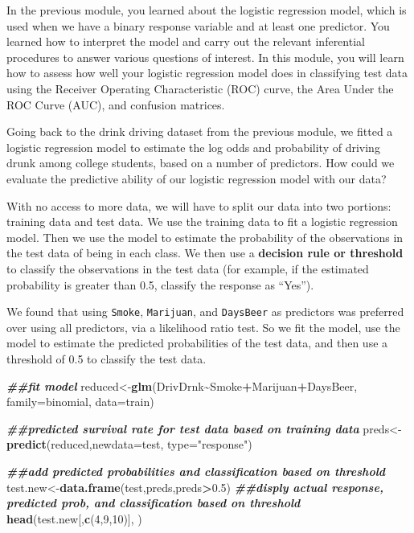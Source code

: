 \documentclass[
]{book}
\newenvironment{Shaded}{\begin{snugshade}}{\end{snugshade}}
\newcommand{\AttributeTok}[1]{\textcolor[rgb]{0.13,0.29,0.53}{#1}}
\newcommand{\DecValTok}[1]{\textcolor[rgb]{0.00,0.00,0.81}{#1}}
\newcommand{\DocumentationTok}[1]{\textcolor[rgb]{0.56,0.35,0.01}{\textbf{\textit{#1}}}}
\newcommand{\FloatTok}[1]{\textcolor[rgb]{0.00,0.00,0.81}{#1}}
\newcommand{\FunctionTok}[1]{\textcolor[rgb]{0.13,0.29,0.53}{\textbf{#1}}}
\newcommand{\NormalTok}[1]{#1}
\newcommand{\OtherTok}[1]{\textcolor[rgb]{0.56,0.35,0.01}{#1}}
\newcommand{\SpecialCharTok}[1]{\textcolor[rgb]{0.81,0.36,0.00}{\textbf{#1}}}
\newcommand{\StringTok}[1]{\textcolor[rgb]{0.31,0.60,0.02}{#1}}
\begin{document}
In the previous module, you learned about the logistic regression model, which is used when we have a binary response variable and at least one predictor. You learned how to interpret the model and carry out the relevant inferential procedures to answer various questions of interest. In this module, you will learn how to assess how well your logistic regression model does in classifying test data using the Receiver Operating Characteristic (ROC) curve, the Area Under the ROC Curve (AUC), and confusion matrices.

Going back to the drink driving dataset from the previous module, we fitted a logistic regression model to estimate the log odds and probability of driving drunk among college students, based on a number of predictors. How could we evaluate the predictive ability of our logistic regression model with our data?

With no access to more data, we will have to split our data into two portions: training data and test data. We use the training data to fit a logistic regression model. Then we use the model to estimate the probability of the observations in the test data of being in each class. We then use a \textbf{decision rule or threshold} to classify the observations in the test data (for example, if the estimated probability is greater than 0.5, classify the response as ``Yes'').

We found that using \texttt{Smoke}, \texttt{Marijuan}, and \texttt{DaysBeer} as predictors was preferred over using all predictors, via a likelihood ratio test. So we fit the model, use the model to estimate the predicted probabilities of the test data, and then use a threshold of 0.5 to classify the test data.

\begin{Shaded}
\begin{Highlighting}[]
\DocumentationTok{\#\#fit model}
\NormalTok{reduced}\OtherTok{\textless{}{-}}\FunctionTok{glm}\NormalTok{(DrivDrnk}\SpecialCharTok{\textasciitilde{}}\NormalTok{Smoke}\SpecialCharTok{+}\NormalTok{Marijuan}\SpecialCharTok{+}\NormalTok{DaysBeer, }\AttributeTok{family=}\NormalTok{binomial, }\AttributeTok{data=}\NormalTok{train)}

\DocumentationTok{\#\#predicted survival rate for test data based on training data}
\NormalTok{preds}\OtherTok{\textless{}{-}}\FunctionTok{predict}\NormalTok{(reduced,}\AttributeTok{newdata=}\NormalTok{test, }\AttributeTok{type=}\StringTok{"response"}\NormalTok{)}

\DocumentationTok{\#\#add predicted probabilities and classification based on threshold}
\NormalTok{test.new}\OtherTok{\textless{}{-}}\FunctionTok{data.frame}\NormalTok{(test,preds,preds}\SpecialCharTok{\textgreater{}}\FloatTok{0.5}\NormalTok{)}
\DocumentationTok{\#\#disply actual response, predicted prob, and classification based on threshold}
\FunctionTok{head}\NormalTok{(test.new[,}\FunctionTok{c}\NormalTok{(}\DecValTok{4}\NormalTok{,}\DecValTok{9}\NormalTok{,}\DecValTok{10}\NormalTok{)], )}
\end{Highlighting}
\end{Shaded}
\end{document}
